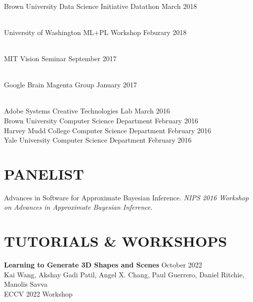 \documentclass[line,margin]{res}
\begin{document}
\begin{resume}
\\
\talk
	{Brown University Data Science Initiative}
	{Datathon}
	{March 2018}

\\
\talk
	{University of Washington}
	{ML+PL Workshop}
	{Feburary 2018}

\\
\talk
	{MIT}
	{Vision Seminar}
	{September 2017}

\\
\talk
	{Google Brain}
	{Magenta Group}
	{January 2017}

\\
\talk
	{Adobe Systems}
	{Creative Technologies Lab}
	{March 2016}\\
\talk
	{Brown University}
	{Computer Science Department}
	{February 2016}\\
\talk
	{Harvey Mudd College}
	{Computer Science Department}
	{February 2016}\\
\talk
	{Yale University}
	{Computer Science Department}
	{February 2016}


\section{PANELIST}

\newcommand{\panelist}[2]{
	#1. \emph{#2}.
}

\panelist{Advances in Software for Approximate Bayesian Inference}{NIPS 2016 Workshop on Advances in Approximate Bayesian Inference}


\section{TUTORIALS \& WORKSHOPS}

\newcommand{\tutorial}[4] {
	\textbf{#1} \hfill #4\\
	#2\\
	#3
}
\newcommand{\workshop}[4] {
	\textbf{#1} \hfill #4\\
	#2\\
	#3
}

\workshop
{Learning to Generate 3D Shapes and Scenes}
{Kai Wang, Akshay Gadi Patil, Angel X. Chang, Paul Guerrero, Daniel Ritchie, Manolis Savva}
{ECCV 2022 Workshop}
{October 2022}


\end{resume}
\end{document}
